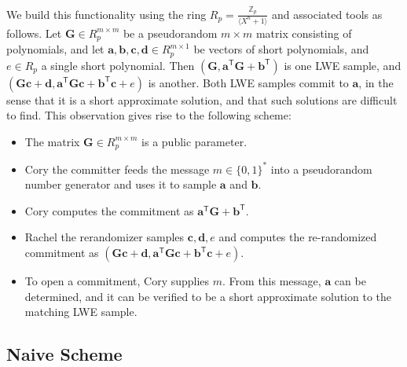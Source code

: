 We build this functionality using the ring $R_p = \frac{\mathbb{Z}_p}{\langle X^n + 1\rangle}$ and associated tools as follows. Let $\mathbf{G} \in R_p^{m \times m}$ be a pseudorandom $m \times m$ matrix consisting of polynomials, and let $\mathbf{a}, \mathbf{b}, \mathbf{c}, \mathbf{d} \in R_p^{m \times 1}$ be vectors of short polynomials, and $e \in R_p$ a single short polynomial. Then $(\mathbf{G}, \mathbf{a}^\mathsf{T} \mathbf{G} + \mathbf{b}^\mathsf{T})$ is one LWE sample, and $(\mathbf{G}\mathbf{c} + \mathbf{d}, \mathbf{a}^\mathsf{T} \mathbf{G} \mathbf{c} + \mathbf{b}^\mathsf{T} \mathbf{c} + e)$ is another. Both LWE samples commit to $\mathbf{a}$, in the sense that it is a short approximate solution, and that such solutions are difficult to find. This observation gives rise to the following scheme:
\begin{itemize}
\item The matrix $\mathbf{G} \in R_p^{m \times m}$ is a public parameter.
\item Cory the committer feeds the message $m \in \{0,1\}^*$ into a pseudorandom number generator and uses it to sample $\mathbf{a}$ and $\mathbf{b}$.
\item Cory computes the commitment as $\mathbf{a}^\mathsf{T} \mathbf{G} + \mathbf{b}^\mathsf{T}$.
\item Rachel the rerandomizer samples $\mathbf{c}, \mathbf{d}, e$ and computes the re-randomized commitment as $(\mathbf{G}\mathbf{c} + \mathbf{d}, \mathbf{a}^\mathsf{T} \mathbf{G} \mathbf{c} + \mathbf{b}^\mathsf{T} \mathbf{c} + e)$.
\item To open a commitment, Cory supplies $m$. From this message, $\mathbf{a}$ can be determined, and it can be verified to be a short approximate solution to the matching LWE sample.
\end{itemize}

\subsection{Naive Scheme}


